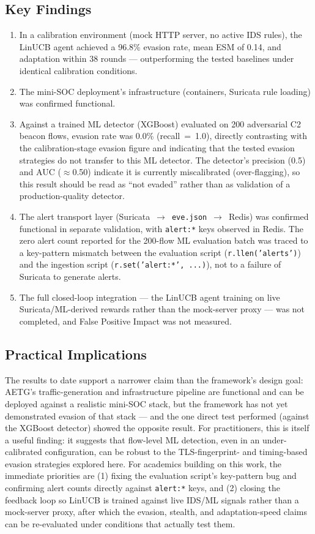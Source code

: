 \documentclass[review]{elsarticle}
\begin{document}
\subsection{Key Findings}
\begin{enumerate}
\item In a calibration environment (mock HTTP server, no active IDS rules), the LinUCB agent achieved a 96.8\% evasion rate, mean ESM of 0.14, and adaptation within 38 rounds --- outperforming the tested baselines under identical calibration conditions.
\item The mini-SOC deployment's infrastructure (containers, Suricata rule loading) was confirmed functional.
\item Against a trained ML detector (XGBoost) evaluated on 200 adversarial C2 beacon flows, evasion rate was 0.0\% (recall~=~1.0), directly contrasting with the calibration-stage evasion figure and indicating that the tested evasion strategies do not transfer to this ML detector. The detector's precision (0.5) and AUC ($\approx$0.50) indicate it is currently miscalibrated (over-flagging), so this result should be read as ``not evaded'' rather than as validation of a production-quality detector.
\item The alert transport layer (Suricata~$\rightarrow$~\texttt{eve.json}~$\rightarrow$~Redis) was confirmed functional in separate validation, with \texttt{alert:*} keys observed in Redis. The zero alert count reported for the 200-flow ML evaluation batch was traced to a key-pattern mismatch between the evaluation script (\texttt{r.llen('alerts')}) and the ingestion script (\texttt{r.set('alert:*', ...)}), not to a failure of Suricata to generate alerts.
\item The full closed-loop integration --- the LinUCB agent training on live Suricata/ML-derived rewards rather than the mock-server proxy --- was not completed, and False Positive Impact was not measured.
\end{enumerate}

\subsection{Practical Implications}
The results to date support a narrower claim than the framework's design goal: AETG's traffic-generation and infrastructure pipeline are functional and can be deployed against a realistic mini-SOC stack, but the framework has not yet demonstrated evasion of that stack --- and the one direct test performed (against the XGBoost detector) showed the opposite result. For practitioners, this is itself a useful finding: it suggests that flow-level ML detection, even in an under-calibrated configuration, can be robust to the TLS-fingerprint- and timing-based evasion strategies explored here. For academics building on this work, the immediate priorities are (1) fixing the evaluation script's key-pattern bug and confirming alert counts directly against \texttt{alert:*} keys, and (2) closing the feedback loop so LinUCB is trained against live IDS/ML signals rather than a mock-server proxy, after which the evasion, stealth, and adaptation-speed claims can be re-evaluated under conditions that actually test them.
\end{document}
